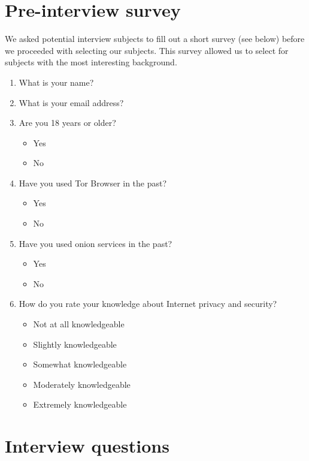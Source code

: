 \appendix

\section{Pre-interview survey}
\label{app:interview-survey}
We asked potential interview subjects to fill out a short survey (see below)
before we proceeded with selecting our subjects.  This survey allowed us to
select for subjects with the most interesting background.

\begin{enumerate}
    \item What is your name?
    \item What is your email address?
    \item Are you 18 years or older?
        \begin{itemize}[label=$\Circle$]
            \item Yes
            \item No
        \end{itemize}
    \item Have you used Tor Browser in the past?
        \begin{itemize}[label=$\Circle$]
            \item Yes
            \item No
        \end{itemize}
    \item Have you used onion services in the past?
        \begin{itemize}[label=$\Circle$]
            \item Yes
            \item No
        \end{itemize}
    \item How do you rate your knowledge about Internet privacy and security?
        \begin{itemize}[label=$\Circle$]
            \item Not at all knowledgeable
            \item Slightly knowledgeable
            \item Somewhat knowledgeable
            \item Moderately knowledgeable
            \item Extremely knowledgeable
        \end{itemize}
\end{enumerate}

\section{Interview questions}
\label{app:interview-questions}


